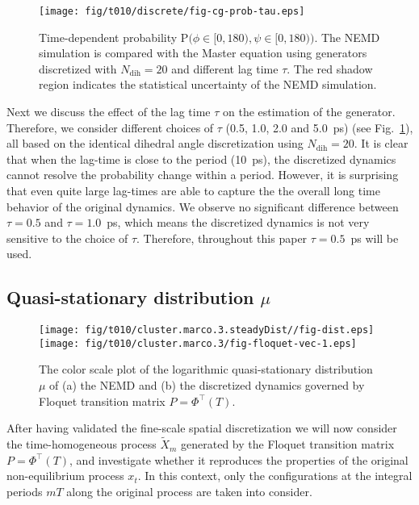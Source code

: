 \documentclass[aps, pre, preprint,unsortedaddress,a4paper,onecolumn]{revtex4}
\newcommand{\vect}[1]{#1}
\newcommand{\myphi}{\Phi}
\newcommand{\mymu}{\mu}
\newcommand{\prob}{\textrm{P}}
\newcommand{\dih}{\textrm{dih}}
\begin{document}
\begin{figure}
  \centering
  \texttt{[image: fig/t010/discrete/fig-cg-prob-tau.eps]}  
  \caption{Time-dependent probability $\prob\big(\phi\in[0,180), \psi\in [0,180)\big)$.  The NEMD simulation is compared with the Master equation using generators discretized with $N_\dih=20$ and different lag time $\tau$. The red shadow region indicates the
    statistical uncertainty of the NEMD simulation.}
  \label{fig:tmp3}
\end{figure}

Next we discuss the effect of the lag time $\tau$ on the estimation of the generator. Therefore, we consider 
different choices of $\tau$ (0.5, 1.0, 2.0 and 5.0~ps)
(see Fig.~\ref{fig:tmp3}), all based on the identical dihedral angle discretization using $N_\dih=20$.
It is clear that when the lag-time is close to the period (10~ps), the
discretized dynamics cannot resolve the probability change within a
period. However, it is surprising  that even quite large lag-times are able to capture the
the overall long time behavior of the original dynamics.
We observe no significant difference between $\tau=0.5$ and
$\tau=1.0$~ps, which means the discretized dynamics is not very sensitive
to the choice of $\tau$.
Therefore, throughout this paper $\tau=0.5$~ps will be used.



\subsection{Quasi-stationary distribution $\mymu$}


\begin{figure}
  \centering  
  \texttt{[image: fig/t010/cluster.marco.3.steadyDist//fig-dist.eps]}
  \texttt{[image: fig/t010/cluster.marco.3/fig-floquet-vec-1.eps]}
  \caption{The color scale plot of the logarithmic quasi-stationary distribution $\mymu$
    of (a) the NEMD  and (b)
    the discretized dynamics governed by Floquet transition matrix $\vect P=\myphi^{\top}(T)$.
  }
  \label{fig:num-1}
\end{figure}

After having validated the fine-scale spatial discretization 
we will now consider the time-homogeneous process $\tilde X_{m}$ generated by
the Floquet transition matrix $P = \Phi^{\top}(T)$, and investigate whether it
reproduces the properties of the original  non-equilibrium process $x_t$.
In this context, only the configurations at the  integral periods $mT$ along the original process
are taken into consider.
\end{document}
